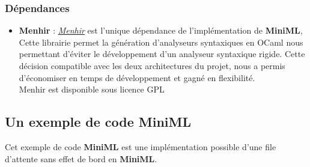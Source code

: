 \documentclass[
  12pt,
]{article}
\providecommand{\tightlist}{%
  \setlength{\itemsep}{0pt}\setlength{\parskip}{0pt}}
\begin{document}
\hypertarget{duxe9pendances}{%
\subsubsection{Dépendances}\label{duxe9pendances}}

\begin{itemize}
\tightlist
\item
  \textbf{Menhir} :
  \href{http://gallium.inria.fr/~fpottier/menhir/}{\emph{Menhir}} est
  l'unique dépendance de l'implémentation de \textbf{MiniML}, Cette
  librairie permet la génération d'analyseurs syntaxiques en OCaml nous
  permettant d'éviter le développement d'un analyseur syntaxique rigide.
  Cette décision compatible avec les deux architectures du projet, nous
  a permis d'économiser en temps de développement et gagné en
  flexibilité.\\
  Menhir est disponible sous licence GPL
\end{itemize}

\hypertarget{un-exemple-de-code-miniml}{%
\subsection{Un exemple de code MiniML}\label{un-exemple-de-code-miniml}}

Cet exemple de code \textbf{MiniML} est une implémentation possible
d'une file d'attente sans effet de bord en \textbf{MiniML}.
\end{document}
